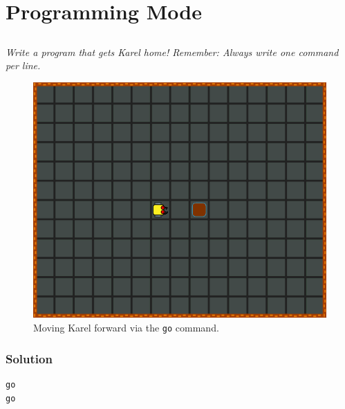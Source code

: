 \documentclass[article,A4,12pt]{llncs}
\begin{document}
\section{Programming Mode}

\subsection{}

{\em Write a program that gets Karel home! Remember: Always write one command per line.}

\begin{figure}[!ht]
\begin{center}
\includegraphics[height=0.4\textwidth]{imgk/b01.png}
\end{center}
\vspace{-4mm}
\caption{Moving Karel forward via the {\tt go} command.}
\label{fig:b01}
\vspace{-4mm}
\end{figure}
\noindent

\subsubsection*{Solution}
\begin{verbatim}
go
go
\end{verbatim}

\newpage
\subsection{}
\end{document}
